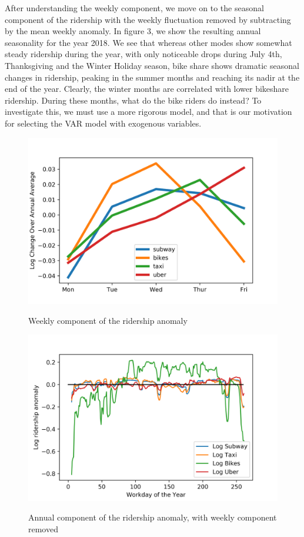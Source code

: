 \documentclass[12pt]{article}
\begin{document}
After understanding the weekly component, we move on to the seasonal component of the ridership with the weekly fluctuation removed by subtracting by the mean weekly anomaly. In figure 3, we show the resulting annual seasonality for the year 2018. We see that whereas other modes show somewhat steady ridership during the year, with only noticeable drops during July 4th, Thanksgiving and the Winter Holiday season, bike share shows dramatic seasonal changes in ridership, peaking in the summer months and reaching its nadir at the end of the year. Clearly, the winter months are correlated with lower bikeshare ridership. During these months, what do the bike riders do instead? To investigate this, we must use a more rigorous model, and that is our motivation for selecting the VAR model with exogenous variables.


\begin{figure}[htbp]
    \includegraphics[scale=1.0]{weekly.PNG} \label{fig:weekly}
    \caption{Weekly component of the ridership anomaly}
\end{figure}


\begin{figure}[htbp]
    \includegraphics[scale=1.0]{annual.PNG} \label{fig:weekly}
    \caption{Annual component of the ridership anomaly, with weekly component removed}
\end{figure}
\end{document}
